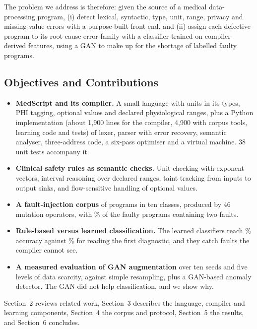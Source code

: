 The problem we address is therefore: given the source of a medical data-processing program, (i) detect lexical,
syntactic, type, unit, range, privacy and missing-value errors with a purpose-built front end, and (ii) assign each
defective program to its root-cause error family with a classifier trained on compiler-derived features, using a GAN
to make up for the shortage of labelled faulty programs.

\subsection{Objectives and Contributions}

\begin{itemize}
    \item \textbf{MedScript and its compiler.} A small language with units in its types, PHI tagging, optional values
    and declared physiological ranges, plus a Python implementation (about 1{,}900 lines for the compiler, 4{,}900
    with corpus tools, learning code and tests) of lexer, parser with error recovery, semantic analyser, three-address
    code, a six-pass optimiser and a virtual machine. 38 unit tests accompany it.
    \item \textbf{Clinical safety rules as semantic checks.} Unit checking with exponent vectors, interval reasoning over
    declared ranges, taint tracking from  inputs to output sinks, and flow-sensitive handling of optional values.
    \item \textbf{A fault-injection corpus} of \NProg{} programs in ten classes, produced by 46 mutation operators, with
    \DoubleShare\% of the faulty programs containing two faults.
    \item \textbf{Rule-based versus learned classification.} The learned classifiers reach \RFAcc\% accuracy against
    \RuleFirstAcc\% for reading the first diagnostic, and they catch faults the compiler cannot see.
    \item \textbf{A measured evaluation of GAN augmentation} over ten seeds and five levels of data scarcity, against
    simple resampling, plus a GAN-based anomaly detector. The GAN did not help classification, and we show why.
\end{itemize}

Section~2 reviews related work, Section~3 describes the language, compiler and learning components, Section~4 the
corpus and protocol, Section~5 the results, and Section~6 concludes.
